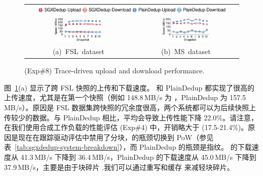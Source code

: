 \begin{figure}[t]
  \centering
  \begin{tabular}{@{\ }c@{\ }c}
  \multicolumn{2}{c}{\includegraphics[width=0.9\textwidth]{pic/sgxdedup/expb2_trace_legend.pdf}} \\
  \hspace{-0.1in}
  \includegraphics[width=0.47\textwidth]{pic/sgxdedup/expb2_trace_fsl_plain_sgx.pdf} &
  \includegraphics[width=0.47\textwidth]{pic/sgxdedup/expb2_trace_ms_plain_sgx.pdf}
  \vspace{-3pt}\\
  \mbox{\small (a) FSL dataset} &
  \mbox{\small (b) MS dataset}
  \end{tabular}
  \vspace{-6pt}
  \caption{(Exp\#8) Trace-driven upload and download performance.}
  \label{fig:sgxdedup-tracePerformance}
\end{figure}

图~\ref{fig:sgxdedup-tracePerformance}(a) 显示了跨 FSL 快照的上传和下载速度。 \sysnameS 和 PlainDedup 都实现了很高的上传速度，尤其是在第一个快照（例如 148.8\,MB/s \sysnameS 为 ，PlainDedup 为 157.5\,MB/s）。原因是 FSL 数据集跨快照的冗余度很高，两个系统都可以为后续快照上传较少的数据。与 PlainDedup 相比，\sysnameS 平均会导致上传性能下降 22.0\%。请注意，在我们使用合成工作负载的性能评估 (Exp\#4) 中，开销略大于 (17.5-21.4\%)。原因是现在在跟踪驱动评估中禁用了分块，\sysnameS 的瓶颈切换到 PoW（参见表~\ref{tab:sgxdedup-system-breakdown}），而 PlainDedup 的瓶颈是指纹。 \sysnameS 的下载速度从 41.3\,MB/s 下降到 36.4\,MB/s，PlainDedup 的下载速度从 45.0\,MB/s 下降到 37.9\,MB/s，主要是由于块碎片 \cite{lillibridge13} .我们可以通过重写和缓存 \cite{lillibridge13,cao18} 来减轻块碎片。

